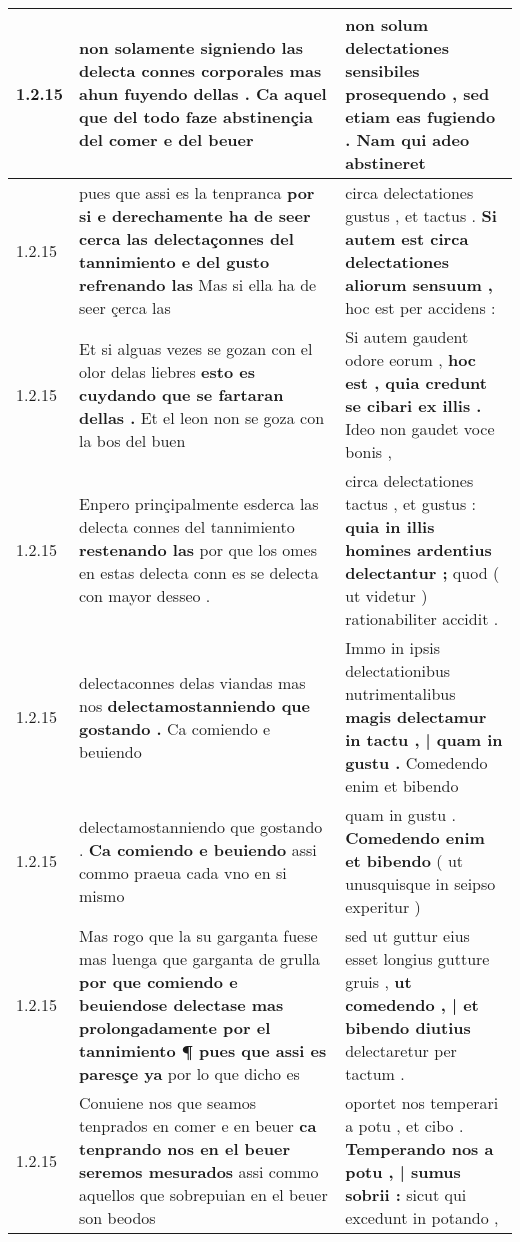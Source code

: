 \begin{tabular}{|p{1cm}|p{6.5cm}|p{6.5cm}|}
1.2.15 & non solamente signiendo las delecta connes corporales \textbf{ mas ahun fuyendo dellas . } Ca aquel que del todo faze abstinençia del comer e del beuer & non solum delectationes sensibiles prosequendo , \textbf{ sed etiam eas fugiendo . } Nam qui adeo abstineret \\\hline
1.2.15 & pues que assi es la tenpranca \textbf{ por si e derechamente ha de seer cerca las delectaçonnes del tannimiento e del gusto refrenando las } Mas si ella ha de seer çerca las & circa delectationes gustus , et tactus . \textbf{ Si autem est circa delectationes aliorum sensuum , } hoc est per accidens : \\\hline
1.2.15 & Et si alguas vezes se gozan con el olor delas liebres \textbf{ esto es cuydando que se fartaran dellas . } Et el leon non se goza con la bos del buen & Si autem gaudent odore eorum , \textbf{ hoc est , quia credunt se cibari ex illis . } Ideo non gaudet voce bonis , \\\hline
1.2.15 & Enpero prinçipalmente esderca las delecta connes del tannimiento \textbf{ restenando las } por que los omes en estas delecta conn es se delecta con mayor desseo . & circa delectationes tactus , et gustus : \textbf{ quia in illis homines ardentius delectantur ; } quod ( ut videtur ) rationabiliter accidit . \\\hline
1.2.15 & delectaconnes delas viandas mas nos \textbf{ delectamostanniendo que gostando . } Ca comiendo e beuiendo & Immo in ipsis delectationibus nutrimentalibus \textbf{ magis delectamur in tactu , | quam in gustu . } Comedendo enim et bibendo \\\hline
1.2.15 & delectamostanniendo que gostando . \textbf{ Ca comiendo e beuiendo } assi commo praeua cada vno en si mismo & quam in gustu . \textbf{ Comedendo enim et bibendo } ( ut unusquisque in seipso experitur ) \\\hline
1.2.15 & Mas rogo que la su garganta fuese mas luenga que garganta de grulla \textbf{ por que comiendo e beuiendose delectase mas prolongadamente por el tannimiento ¶ pues que assi es paresçe ya } por lo que dicho es & sed ut guttur eius esset longius gutture gruis , \textbf{ ut comedendo , | et bibendo diutius } delectaretur per tactum . \\\hline
1.2.15 & Conuiene nos que seamos tenprados en comer e en beuer \textbf{ ca tenprando nos en el beuer seremos mesurados } assi commo aquellos que sobrepuian en el beuer son beodos & oportet nos temperari a potu , et cibo . \textbf{ Temperando nos a potu , | sumus sobrii : } sicut qui excedunt in potando , \\\hline

\end{tabular}
